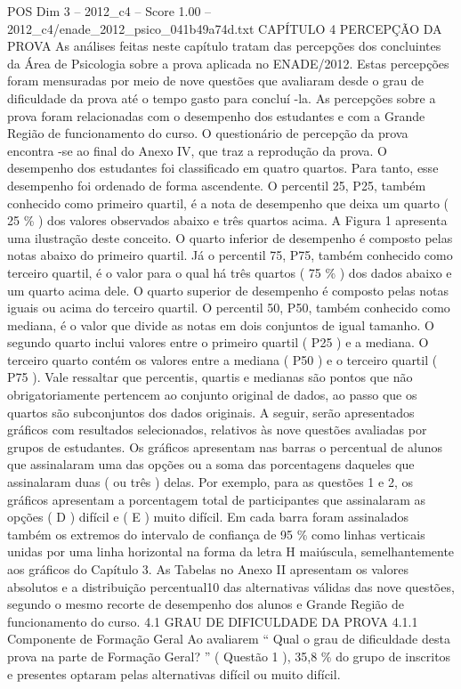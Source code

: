 \begin{textsample}{POS Dim 3 – 2012\_c4 – Score 1.00 – 2012\_c4/enade\_2012\_psico\_041b49a74d.txt}  \label{ex:f3_pos_152}
CAPÍTULO 4 PERCEPÇÃO DA PROVA As análises feitas neste capítulo tratam das percepções dos concluintes da Área de Psicologia sobre a prova aplicada no ENADE/2012.
Estas percepções foram mensuradas por meio de nove questões que avaliaram desde o grau de dificuldade da prova até o tempo gasto para concluí -la.
As percepções sobre a prova foram relacionadas com o desempenho dos estudantes e com a Grande Região de funcionamento do curso.
O questionário de percepção da prova encontra -se ao final do Anexo IV, que traz a reprodução da prova.
O desempenho dos estudantes foi classificado em quatro quartos.
Para tanto, esse desempenho foi ordenado de forma ascendente.
O percentil 25, P25, também conhecido como primeiro quartil, é a nota de desempenho que deixa um quarto ( 25 \% ) dos valores observados abaixo e três quartos acima.
A Figura 1 apresenta uma ilustração deste conceito.
O quarto inferior de desempenho é composto pelas notas abaixo do primeiro quartil.
Já o percentil 75, P75, também conhecido como terceiro quartil, é o valor para o qual há três quartos ( 75 \% ) dos dados abaixo e um quarto acima dele.
O quarto superior de desempenho é composto pelas notas iguais ou acima do terceiro quartil.
O percentil 50, P50, também conhecido como mediana, é o valor que divide as notas em dois conjuntos de igual tamanho.
O segundo quarto inclui valores entre o primeiro quartil ( P25 ) e a mediana.
O terceiro quarto contém os valores entre a mediana ( P50 ) e o terceiro quartil ( P75 ).
Vale ressaltar que percentis, quartis e medianas são pontos que não obrigatoriamente pertencem ao conjunto original de dados, ao passo que os quartos são subconjuntos dos dados originais.
A seguir, serão apresentados gráficos com resultados selecionados, relativos às nove questões avaliadas por grupos de estudantes.
Os gráficos apresentam nas barras o percentual de alunos que assinalaram uma das opções ou a soma das porcentagens daqueles que assinalaram duas ( ou três ) delas.
Por exemplo, para as questões 1 e 2, os gráficos apresentam a porcentagem total de participantes que assinalaram as opções ( D ) difícil e ( E ) muito difícil.
Em cada barra foram assinalados também os extremos do intervalo de confiança de 95 \% como linhas verticais unidas por uma linha horizontal na forma da letra H maiúscula, semelhantemente aos gráficos do Capítulo 3.
As Tabelas no Anexo II apresentam os valores absolutos e a distribuição percentual10 das alternativas válidas das nove questões, segundo o mesmo recorte de desempenho dos alunos e Grande Região de funcionamento do curso. 4.1 GRAU DE DIFICULDADE DA PROVA 4.1.1 Componente de Formação Geral Ao avaliarem “ Qual o grau de dificuldade desta prova na parte de Formação Geral? ” ( Questão 1 ), 35,8 \% do grupo de inscritos e presentes optaram pelas alternativas difícil ou muito difícil.

\end{textsample}
